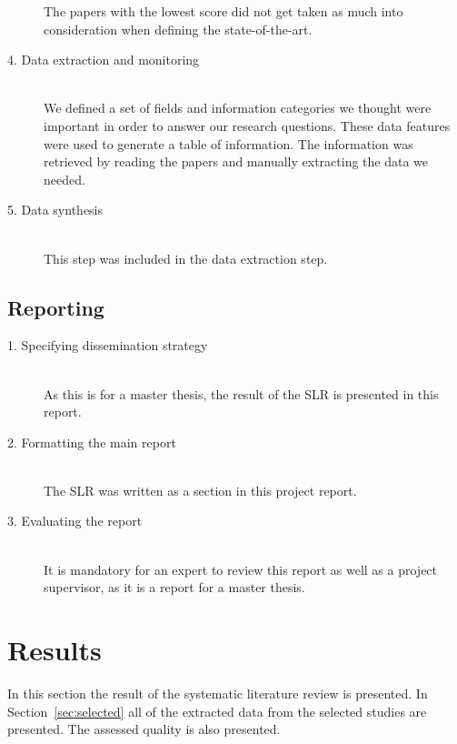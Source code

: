\begin{description}
		The papers with the lowest score did not get taken as much into consideration when defining the state-of-the-art. 
		
	\item[4. Data extraction and monitoring] \hfill \\
		We defined a set of fields and information categories we thought were important in order to answer our research questions. These data features were used to generate a table of information. The information was retrieved by reading the papers and manually extracting the data we needed.
	

	\item[5. Data synthesis] \hfill \\
		This step was included in the data extraction step.
\end{description}


\subsection{Reporting}


\begin{description}

	\item[1. Specifying dissemination strategy] \hfill \\
		As this is for a master thesis, the result of the SLR is presented in this report.  

	\item[2. Formatting the main report] \hfill \\
		The SLR was written as a section in this project report. 

	\item[3. Evaluating the report] \hfill \\
		It is mandatory for an expert to review this report as well as a project supervisor, as it is a report for a master thesis.

\end{description}

\section{Results}
\label{sec:slrresults}

In this section the result of the systematic literature review is presented. In Section~\ref{sec:selected} all of the extracted data from the selected studies are presented. The assessed quality is also presented. 

